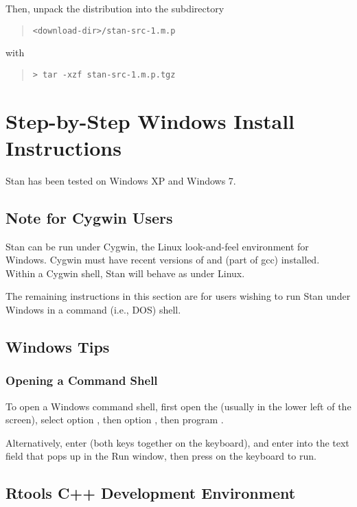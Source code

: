 Then, unpack the distribution into the subdirectory
\begin{quote}
\nolinkurl{<download-dir>/stan-src-1.m.p}
\end{quote}
%
with
%
\begin{quote}
\begin{Verbatim}[fontshape=sl]
> tar -xzf stan-src-1.m.p.tgz
\end{Verbatim}
\end{quote}



\section{Step-by-Step Windows Install Instructions}

Stan has been tested on Windows XP and Windows 7.

\subsection{Note for Cygwin Users}

Stan can be run under Cygwin, the Linux look-and-feel environment for
Windows.  Cygwin must have recent versions of  and
 (part of gcc) installed.  Within a Cygwin shell, Stan
will behave as under Linux. 

The remaining instructions in this section are for users wishing to
run Stan under Windows in a command (i.e., DOS) shell.

\subsection{Windows Tips}

\subsubsection{Opening a Command Shell}

To open a Windows command shell, first open the 
(usually in the lower left of the screen), select option
, then option , then
program .

Alternatively, enter \code{[Windows+r]} (both keys together on the
keyboard), and enter  into the text field that pops up in
the Run window, then press \code{[Return]} on the keyboard to run.

\subsection{Rtools C++ Development Environment}

